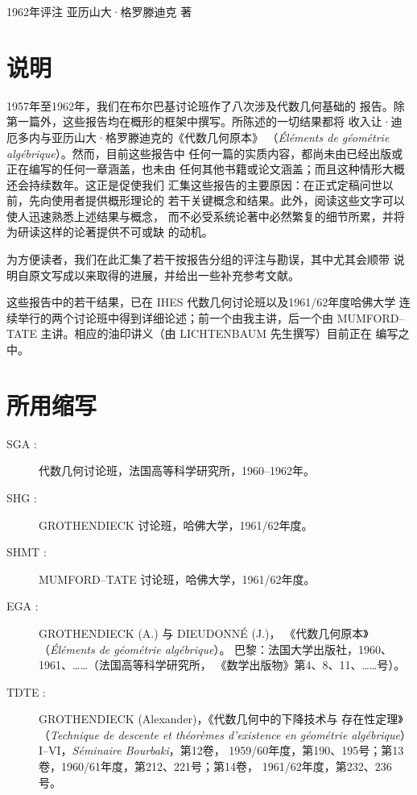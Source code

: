 \unit{1962年评注}
%
  {亚历山大·格罗滕迪克 著}

\section*{说明}

1957年至1962年，我们在布尔巴基讨论班作了八次涉及代数几何基础的
报告。除第一篇外，这些报告均在概形的框架中撰写。所陈述的一切结果都将
收入让·迪厄多内与亚历山大·格罗滕迪克的《代数几何原本》
（\emph{Éléments de géométrie algébrique}）。然而，目前这些报告中
任何一篇的实质内容，都尚未由已经出版或正在编写的任何一章涵盖，也未由
任何其他书籍或论文涵盖；而且这种情形大概还会持续数年。这正是促使我们
汇集这些报告的主要原因：在正式定稿问世以前，先向使用者提供概形理论的
若干关键概念和结果。此外，阅读这些文字可以使人迅速熟悉上述结果与概念，
而不必受系统论著中必然繁复的细节所累，并将为研读这样的论著提供不可或缺
的动机。

为方便读者，我们在此汇集了若干按报告分组的评注与勘误，其中尤其会顺带
说明自原文写成以来取得的进展，并给出一些补充参考文献。

这些报告中的若干结果，已在 IHES 代数几何讨论班以及1961/62年度哈佛大学
连续举行的两个讨论班中得到详细论述；前一个由我主讲，后一个由
MUMFORD--TATE 主讲。相应的油印讲义（由 LICHTENBAUM 先生撰写）目前正在
编写之中。

\section*{所用缩写}

\begin{description}
\item[SGA :] 代数几何讨论班，法国高等科学研究所，1960--1962年。

\item[SHG :] GROTHENDIECK 讨论班，哈佛大学，1961/62年度。

\item[SHMT :] MUMFORD--TATE 讨论班，哈佛大学，1961/62年度。

\item[EGA :] GROTHENDIECK (A.) 与 DIEUDONNÉ (J.)，
《代数几何原本》（\emph{Éléments de géométrie algébrique}）。
巴黎：法国大学出版社，1960、1961、……（法国高等科学研究所，
《数学出版物》第4、8、11、……号）。

\item[TDTE :] GROTHENDIECK (Alexander)，《代数几何中的下降技术与
存在性定理》（\emph{Technique de descente et théorèmes d'existence
en géométrie algébrique}）I--VI，\emph{Séminaire Bourbaki}，第12卷，
1959/60年度，第190、195号；第13卷，1960/61年度，第212、221号；第14卷，
1961/62年度，第232、236号。
\end{description}

\par
